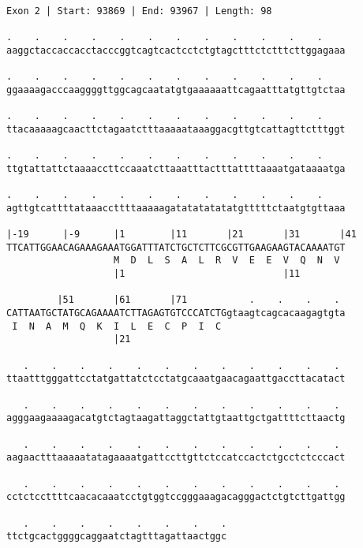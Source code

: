 \documentclass{article}
\begin{document}
\newpage
\begin{Verbatim}
Exon 2 | Start: 93869 | End: 93967 | Length: 98
 
.    .    .    .    .    .    .    .    .    .    .    .    
aaggctaccaccacctacccggtcagtcactcctctgtagctttctctttcttggagaaa
  
.    .    .    .    .    .    .    .    .    .    .    .    
ggaaaagacccaaggggttggcagcaatatgtgaaaaaattcagaatttatgttgtctaa
  
.    .    .    .    .    .    .    .    .    .    .    .    
ttacaaaaagcaacttctagaatctttaaaaataaaggacgttgtcattagttctttggt
  
.    .    .    .    .    .    .    .    .    .    .    .    
ttgtattattctaaaaccttccaaatcttaaatttactttattttaaaatgataaaatga
  
.    .    .    .    .    .    .    .    .    .    .    .    
agttgtcattttataaaccttttaaaaagatatatatatatgtttttctaatgtgttaaa
  
|-19      |-9      |1        |11       |21       |31       |41
TTCATTGGAACAGAAAGAAATGGATTTATCTGCTCTTCGCGTTGAAGAAGTACAAAATGT
                   M  D  L  S  A  L  R  V  E  E  V  Q  N  V 
                   |1                            |11        
  
         |51       |61       |71           .    .    .    . 
CATTAATGCTATGCAGAAAATCTTAGAGTGTCCCATCTGgtaagtcagcacaagagtgta
 I  N  A  M  Q  K  I  L  E  C  P  I  C                      
                   |21                                      
  
   .    .    .    .    .    .    .    .    .    .    .    . 
ttaatttgggattcctatgattatctcctatgcaaatgaacagaattgaccttacatact
  
   .    .    .    .    .    .    .    .    .    .    .    . 
agggaagaaaagacatgtctagtaagattaggctattgtaattgctgattttcttaactg
  
   .    .    .    .    .    .    .    .    .    .    .    . 
aagaactttaaaaatatagaaaatgattccttgttctccatccactctgcctctcccact
  
   .    .    .    .    .    .    .    .    .    .    .    . 
cctctccttttcaacacaaatcctgtggtccgggaaagacagggactctgtcttgattgg
  
   .    .    .    .    .    .    .    .
ttctgcactggggcaggaatctagtttagattaactggc
\end{Verbatim}
\newpage
\end{document}
